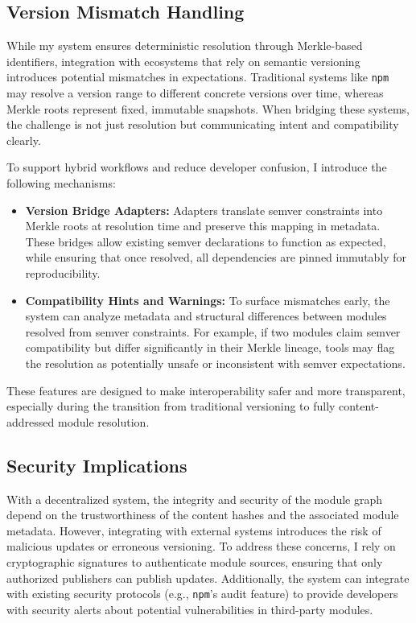\documentclass[sigplan,screen]{acmart}
\begin{document}
\subsection{Version Mismatch Handling}
\label{sec:version-mismatch}

While my system ensures deterministic resolution thr\-ough Merkle-based identifiers, integration with ecosystems that rely on semantic versioning introduces potential mismatches in expectations. Traditional systems like \texttt{npm} may resolve a version range to different concrete versions over time, whereas Merkle roots represent fixed, immutable snapshots. When bridging these systems, the challenge is not just resolution but communicating intent and compatibility clearly.

To support hybrid workflows and reduce developer confusion, I introduce the following mechanisms:

\begin{itemize}
	\item \textbf{Version Bridge Adapters:} Adapters translate semver constraints into Merkle roots at resolution time and preserve this mapping in metadata. These bridges allow existing semver declarations to function as expected, while ensuring that once resolved, all dependencies are pinned immutably for reproducibility.
	\item \textbf{Compatibility Hints and Warnings:} To surface mismatches early, the system can analyze metadata and structural differences between modules resolved from semver constraints. For example, if two modules claim semver compatibility but differ significantly in their Merkle lineage, tools may flag the resolution as potentially unsafe or inconsistent with semver expectations.
\end{itemize}

These features are designed to make interoperability safer and more transparent, especially during the transition from traditional versioning to fully content-addressed module resolution.

\subsection{Security Implications}

With a decentralized system, the integrity and security of the module graph depend on the trustworthiness of the content hashes and the associated module metadata. However, integrating with external systems introduces the risk of malicious updates or erroneous versioning. To address these concerns, I rely on cryptographic signatures to authenticate module sources, ensuring that only authorized publishers can publish updates. Additionally, the system can integrate with existing security protocols (e.g., \texttt{npm}'s audit feature) to provide developers with security alerts about potential vulnerabilities in third-party modules.
\end{document}
